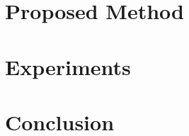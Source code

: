 \documentclass[journal]{IEEEtran}
\begin{document}
    \section{Proposed Method}   \label{sec:ProposedMethod}  

    \section{Experiments}       \label{sec:Experiments}     

    \section{Conclusion}        \label{sec:Conclusion}      

    \ifCLASSOPTIONcaptionsoff
      \newpage
    \fi

    \newpage

    \begin{spacing}{1}
        \small
        
        
    \end{spacing}
\end{document}
